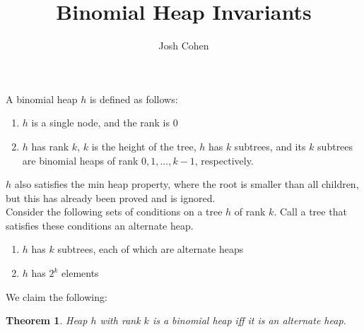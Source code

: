 \documentclass{article}
\title{Binomial Heap Invariants}
\author{Josh Cohen}
\newtheorem{theorem}{Theorem}
\begin{document}
A binomial heap $h$ is defined as follows:
\begin{enumerate}
\item
$h$ is a single node, and the rank is 0
\item
$h$ has rank $k$, $k$ is the height of the tree, $h$ has $k$ subtrees, and its $k$ subtrees are binomial heaps of rank $0, 1, ..., k-1$, respectively.
\end{enumerate}
$h$ also satisfies the min heap property, where the root is smaller than all children, but this has already been proved and is ignored.
\\Consider the following sets of conditions on a tree $h$ of rank $k$. Call a tree that satisfies these conditions an alternate heap.
\begin{enumerate}
\item
$h$ has $k$ subtrees, each of which are alternate heaps
\item
$h$ has $2^k$ elements
\end{enumerate}
We claim the following:
\begin{theorem}
Heap $h$ with rank $k$ is a binomial heap iff it is an alternate heap.
\end{theorem}
\end{document}
